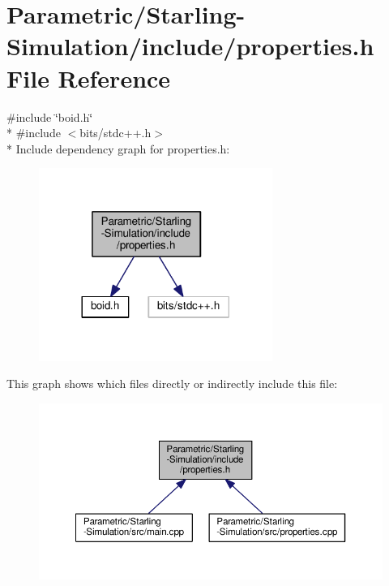 \hypertarget{_parametric_2_starling-_simulation_2include_2properties_8h}{}\section{Parametric/\+Starling-\/\+Simulation/include/properties.h File Reference}
\label{_parametric_2_starling-_simulation_2include_2properties_8h}
{\ttfamily \#include \char`\"{}boid.\+h\char`\"{}}\\*
{\ttfamily \#include $<$bits/stdc++.\+h$>$}\\*
Include dependency graph for properties.\+h\+:
\nopagebreak
\begin{figure}[H]
\begin{center}
\leavevmode
\includegraphics[width=216pt]{_parametric_2_starling-_simulation_2include_2properties_8h__incl}
\end{center}
\end{figure}
This graph shows which files directly or indirectly include this file\+:
\nopagebreak
\begin{figure}[H]
\begin{center}
\leavevmode
\includegraphics[width=350pt]{_parametric_2_starling-_simulation_2include_2properties_8h__dep__incl}
\end{center}
\end{figure}
